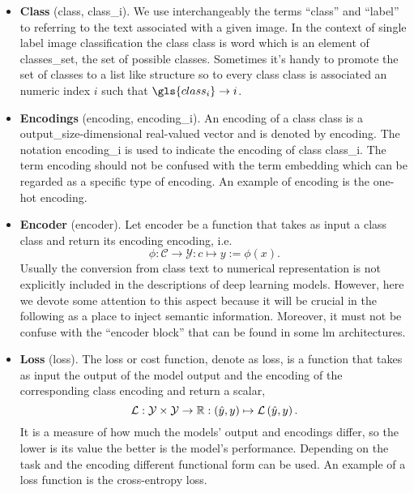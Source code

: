 \begin{itemize}
\item \textbf{Class} (\gls{class}, \gls{class_i}). We use interchangeably the terms ``class'' and ``label'' to referring to the text associated with a given image. In the context of single label image classification the class \gls{class} is word which is an element of \gls{classes_set}, the set of possible classes. Sometimes it's handy to promote the set of classes to a list like structure so to every class \gls{class} is associated an numeric index $i$ such that $\gls{class_i} \to i$.

\item \textbf{Encodings} (\gls{encoding}, \gls{encoding_i}). An encoding of a class \gls{class} is a \gls{output_size}-dimensional real-valued vector and is denoted by \gls{encoding}. The notation \gls{encoding_i} is used to indicate the encoding of class \gls{class_i}. The term encoding should not be confused with the term embedding which can be regarded as a specific type of encoding. An example of encoding is the one-hot encoding.

\item \textbf{Encoder} (\gls{encoder}). Let \gls{encoder} be a function that takes as input a class \gls{class} and return its encoding \gls{encoding}, i.e.\
\begin{equation}
  \phi: \mathcal{C} \to \mathcal{Y} : c \mapsto y := \phi \left(x\right).
  \label{eq:encoder}
\end{equation}
Usually the conversion from class text to numerical representation is not explicitly included in the descriptions of deep learning models. However, here we devote some attention to this aspect because it will be crucial in the following as a place to inject semantic information. Moreover, it must not be confuse with the ``encoder block'' that can be found in some \acrshort{lm} architectures.

\item \textbf{Loss} (\gls{loss}). The loss or cost function, denote as \gls{loss}, is a function that takes as input the output of the model \gls{output} and the encoding of the corresponding class \gls{encoding} and return a scalar,
\begin{equation}
  \operatorname{\mathcal{L}}: \mathcal{Y} \times \mathcal{Y} \to \mathbb{R}
       : \left(\hat{y}, y\right) \mapsto \operatorname{\mathcal{L}} \left(\hat{y}, y\right).
  \label{eq:loss}
\end{equation}
It is a measure of how much the models' output and encodings differ, so the lower is its value the better is the model's performance. Depending on the task and the encoding different functional form can be used. An example of a loss function is the cross-entropy loss.

\end{itemize}

